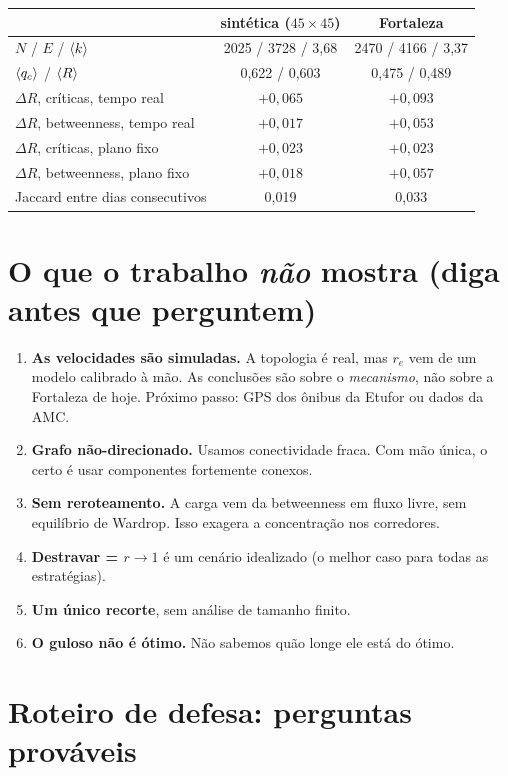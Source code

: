 \documentclass[11pt]{article}
\begin{document}
\begin{center}
\begin{tabular}{lcc}
\toprule
& sintética ($45\times45$) & Fortaleza\\
\midrule
$N$ / $E$ / $\left\langle k \right\rangle$ & 2025 / 3728 / 3,68 & 2470 / 4166 / 3,37\\
$\left\langle q_c \right\rangle$ / $\left\langle R \right\rangle$ & 0,622 / 0,603 & 0,475 / 0,489\\
$\Delta R$, críticas, tempo real & $+0{,}065$ & $+0{,}093$\\
$\Delta R$, betweenness, tempo real & $+0{,}017$ & $+0{,}053$\\
$\Delta R$, críticas, plano fixo & $+0{,}023$ & $+0{,}023$\\
$\Delta R$, betweenness, plano fixo & $+0{,}018$ & $+0{,}057$\\
Jaccard entre dias consecutivos & 0,019 & 0,033\\
\bottomrule
\end{tabular}
\end{center}

\section{O que o trabalho \emph{não} mostra (diga antes que perguntem)}

\begin{enumerate}
  \item \textbf{As velocidades são simuladas.} A topologia é real, mas $r_e$ vem de um modelo calibrado à mão. As conclusões são sobre o \emph{mecanismo}, não sobre a Fortaleza de hoje. Próximo passo: GPS dos ônibus da Etufor ou dados da AMC.
  \item \textbf{Grafo não-direcionado.} Usamos conectividade fraca. Com mão única, o certo é usar componentes fortemente conexos.
  \item \textbf{Sem reroteamento.} A carga vem da betweenness em fluxo livre, sem equilíbrio de Wardrop. Isso exagera a concentração nos corredores.
  \item \textbf{Destravar = $r\to1$} é um cenário idealizado (o melhor caso para todas as estratégias).
  \item \textbf{Um único recorte}, sem análise de tamanho finito.
  \item \textbf{O guloso não é ótimo.} Não sabemos quão longe ele está do ótimo.
\end{enumerate}

\section{Roteiro de defesa: perguntas prováveis}
\end{document}
